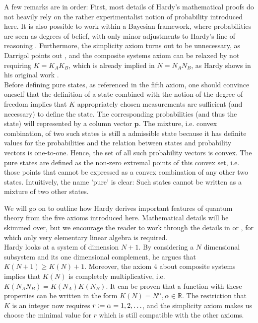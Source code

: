 \documentclass[11pt, a4paper]{article}
\newcommand{\defeq}{\vcentcolon=}
\newcommand{\R}{\mathbb{R}}
\begin{document}
A few remarks are in order: First, most details of Hardy's mathematical proofs do not heavily rely on the rather experimentalist notion of probability introduced here. It is also possible to work within a Bayesian framework, where probabilities are seen as degrees of belief, with only minor adjustments to Hardy's line of reasoning \cite{Schack_2003}. Furthermore, the simplicity axiom turns out to be unnecessary, as Darrigol points out \cite{DARRIGOL}, and the composite systems axiom can be relaxed by not requiring $K = K_AK_B$, which is already implied in $N = N_AN_B$, as Hardy shows in his original work \cite[Sect. 6.15]{hardy2001quantum}.\\
Before defining pure states, as referenced in the fifth axiom, one should convince oneself that the definition of a state combined with the notion of the degree of freedom implies that $K$ appropriately chosen measurements are sufficient (and necessary) to define the state. The corresponding probabilities (and thus the state) will represented by a column vector $\mathbf p$. The mixture, i.e. convex combination, of two such states is still a admissible state because it has definite values for the probabilities and the relation between states and probability vectors is one-to-one. Hence, the set of all such probability vectors is convex. The pure states are defined as the non-zero extremal points of this convex set, i.e. those points that cannot be expressed as a convex combination of any other two states. Intuitively, the name 'pure' is clear: Such states cannot be written as a mixture of two other states. \par
\vspace{8pt}
We will go on to outline how Hardy derives important features of quantum theory from the five axioms introduced here. Mathematical details will be skimmed over, but we encourage the reader to work through the details in \cite{DARRIGOL} or \cite{hardy2001quantum}, for which only very elementary linear algebra is required. \\
Hardy looks at a system of dimension $N+1$. By considering a $N$ dimensional subsystem and its one dimensional complement, he argues that $K(N+1)\geq K(N)+1$. Moreover, the axiom 4 about composite systems implies that $K(N)$ is completely multiplicative, i.e. $K(N_A N_B)=K(N_A)K(N_B)$. It can be proven that a function with these properties can be written in the form $K(N)=N^\alpha, \alpha\in\R$. The restriction that $K$ is an integer now requires $r\defeq\alpha=1,2,\ldots$, and the simplicity axiom makes us choose the minimal value for $r$ which is still compatible with the other axioms.\\
\end{document}
